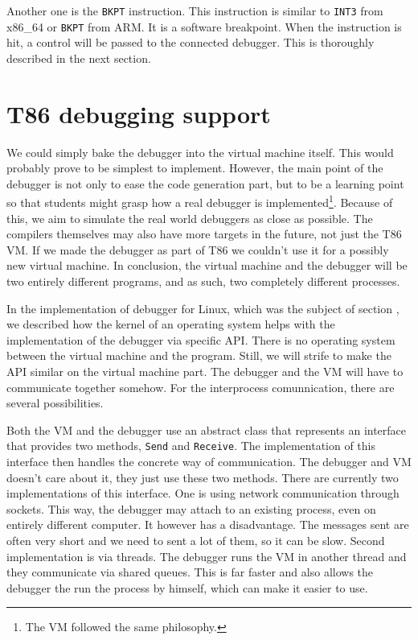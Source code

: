 Another one is the \texttt{BKPT} instruction. This instruction is similar to
\texttt{INT3} from x86\_64 or \texttt{BKPT} from ARM. It is a software
breakpoint. When the instruction is hit, a control will be passed to the
connected debugger. This is thoroughly described in the next section. 

\section{T86 debugging support}
We could simply bake the debugger into the virtual machine itself. This would
probably prove to be simplest to implement. However, the main point of the
debugger is not only to ease the code generation part, but to be a learning
point so that students might grasp how a real debugger is
implemented\footnote{The VM followed the same philosophy.}. Because of this, we
aim to simulate the real world debuggers as close as possible. The compilers
themselves may also have more targets in the future, not just the T86 VM. If we
made the debugger as part of T86 we couldn't use it for a possibly new virtual
machine. In conclusion, the virtual machine and the debugger will be two
entirely different programs, and as such, two completely different processes.

In the implementation of debugger for Linux, which was the subject of section
, we described how the kernel of an operating system helps with the
implementation of the debugger via specific API. There is no operating system
between the virtual machine and the program. Still, we will strife to make the
API similar on the virtual machine part. The debugger and the VM will have to
communicate together somehow. For the interprocess comunnication, there are
several possibilities.

Both the VM and the debugger use an abstract class that represents an interface
that provides two methods, \texttt{Send} and \texttt{Receive}. The implementation
of this interface then handles the concrete way of communication. The debugger
and VM doesn't care about it, they just use these two methods. There are currently
two implementations of this interface. One is using network communication through
sockets. This way, the debugger may attach to an existing process, even on
entirely different computer. It however has a disadvantage. The messages sent
are often very short and we need to sent a lot of them, so it can be slow.
Second implementation is via threads. The debugger runs the VM in another
thread and they communicate via shared queues. This is far faster and also
allows the debugger the run the process by himself, which can make it easier
to use.

